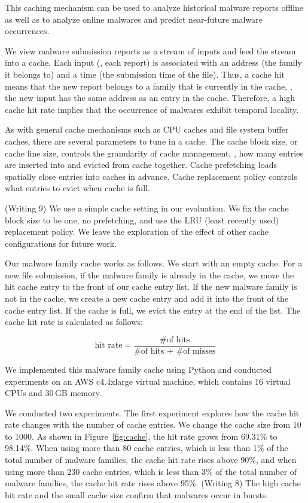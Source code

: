 This caching mechanism can be used to analyze historical malware reports offline 
as well as to analyze online malwares and predict near-future malware occurrences.

We view malware submission reports as a stream of inputs 
and feed the stream into a cache. 
Each input (\ie, each report) is associated with an address (the family it belongs to) and a time (the submission time of the file).
Thus, a cache hit means that the new report belongs to a family that is currently in the cache,
\ie, the new input has the same address as an entry in the cache.
Therefore, a high cache hit rate implies that the occurrence of malwares exhibit temporal locality.

As with general cache mechanisms such as CPU caches and file system buffer caches, 
there are several parameters to tune in a cache.
The cache block size, or cache line size, controls the granularity of cache management, 
\ie, how many entries are inserted into and evicted from cache together.
Cache prefetching loads spatially close entries into caches in advance. 
Cache replacement policy controls what entries to evict when cache is full.
{\color{red} (Writing 9)
We use a simple cache setting in our evaluation. 
We fix the cache block size to be one, no prefetching, 
and use the LRU (least recently used) replacement policy.
We leave the exploration of the effect of other cache configurations for future work. 

Our malware family cache works as follows.
We start with an empty cache. 
For a new file submission, if the malware family is already in the cache, 
we move the hit cache entry to the front of our cache entry list. 
If the new malware family is not in the cache, 
we create a new cache entry and add it into the front of the cache entry list.
If the cache is full, we evict the entry at the end of the list. 
The cache hit rate is calculated as follows: 
}

$$ \mbox{hit rate} = \dfrac{\mbox{\# of hits}}{\mbox{\# of hits + \# of misses}}$$

We implemented this malware family cache using Python
and conducted experiments on an AWS c4.4xlarge virtual machine, 
which contains 16 virtual CPUs and 30\,GB memory.

We conducted two experiments. 
The first experiment explores how the cache hit rate changes with the number of cache entries. 
We change the cache size from 10 to 1000. 
As shown in Figure~\ref{fig:cache}, the hit rate grows from 69.31\% to 98.14\%. 
When using more than 80 cache entries, which is less than 1\% of the total number of malware families, the cache hit rate rises above 90\%, 
and when using more than 230 cache entries, which is less than 3\% of the total number of malware families, 
the cache hit rate rises above 95\%. 
{\color{red} (Writing 8)
The high cache hit rate and the small cache size confirm that malwares occur in bursts.
}

